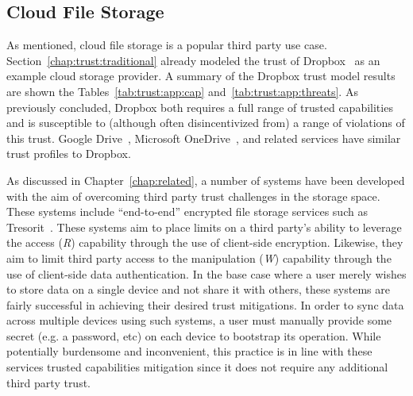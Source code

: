 \subsection{Cloud File Storage}

As mentioned, cloud file storage is a popular third party use
case. Section~\ref{chap:trust:traditional} already modeled the trust
of Dropbox~\cite{dropbox} as an example cloud storage provider. A
summary of the Dropbox trust model results are shown the
Tables~\ref{tab:trust:app:cap} and~\ref{tab:trust:app:threats}. As
previously concluded, Dropbox both requires a full range of trusted
capabilities and is susceptible to (although often disincentivized
from) a range of violations of this trust. Google
Drive~\cite{google-drive}, Microsoft
OneDrive~\cite{microsoft-onedrive}, and related services have similar
trust profiles to Dropbox.

As discussed in Chapter~\ref{chap:related}, a number of systems have
been developed with the aim of overcoming third party trust challenges
in the storage space. These systems include ``end-to-end'' encrypted
file storage services such as Tresorit~\cite{tresorit}. These systems
aim to place limits on a third party's ability to leverage the access
(\emph{R}) capability through the use of client-side
encryption. Likewise, they aim to limit third party access to the
manipulation (\emph{W}) capability through the use of client-side data
authentication. In the base case where a user merely wishes to store
data on a single device and not share it with others, these systems
are fairly successful in achieving their desired trust mitigations. In
order to sync data across multiple devices using such systems, a user
must manually provide some secret (e.g. a password, etc) on each
device to bootstrap its operation. While potentially burdensome and
inconvenient, this practice is in line with these services trusted
capabilities mitigation since it does not require any additional third
party trust.

